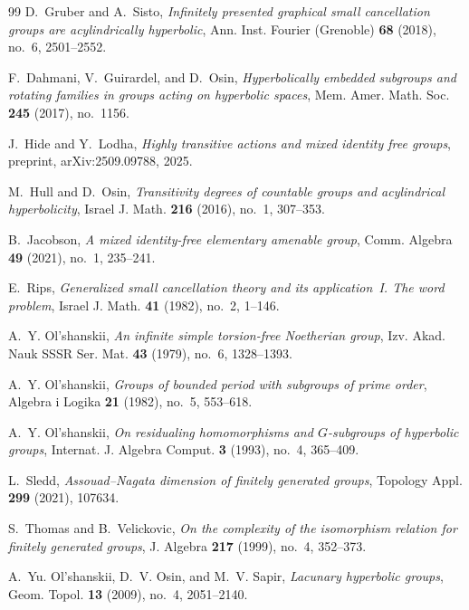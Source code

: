 \documentclass[12pt]{amsart}
\theoremstyle{plain}
\theoremstyle{definition}
\begin{document}
\begin{thebibliography}{99}
D.~Gruber and A.~Sisto,
\textit{Infinitely presented graphical small cancellation groups are acylindrically hyperbolic},
Ann. Inst. Fourier (Grenoble) \textbf{68} (2018), no.~6, 2501--2552.

F.~Dahmani, V.~Guirardel, and D.~Osin,
\textit{Hyperbolically embedded subgroups and rotating families in groups acting
on hyperbolic spaces},
Mem. Amer. Math. Soc. \textbf{245} (2017), no.~1156.

J.~Hide and Y.~Lodha,
\textit{Highly transitive actions and mixed identity free groups},
preprint, arXiv:2509.09788, 2025.

M.~Hull and D.~Osin,
\textit{Transitivity degrees of countable groups and acylindrical hyperbolicity},
Israel J. Math. \textbf{216} (2016), no.~1, 307--353.


B.~Jacobson,
\textit{A mixed identity-free elementary amenable group},
Comm. Algebra \textbf{49} (2021), no.~1, 235--241.


E.~Rips,
\textit{Generalized small cancellation theory and its application~I\@. The word problem},
Israel J. Math. \textbf{41} (1982), no.~2, 1--146.

A.~Y. Ol'shanskii, \textit{An infinite simple torsion-free Noetherian group}, Izv. Akad. Nauk SSSR Ser. Mat. \textbf{43} (1979), no.~6, 1328--1393.


A.~Y. Ol'shanskii, \textit{Groups of bounded period with subgroups of prime order}, Algebra i Logika {\bf 21} (1982), no.~5, 553--618.


 A.~Y. Ol'shanskii, \textit{On residualing homomorphisms and $G$-subgroups of hyperbolic groups}, Internat. J. Algebra Comput. \textbf{3} (1993), no.~4, 365--409. 


L.~Sledd,
\textit{Assouad--Nagata dimension of finitely generated groups},
Topology Appl. \textbf{299} (2021), 107634.

S.~Thomas and B.~Velickovic,
\textit{On the complexity of the isomorphism relation for finitely generated groups},
J. Algebra \textbf{217} (1999), no.~4, 352--373.

A.~Yu. Ol'shanskii, D.~V. Osin, and M.~V. Sapir,
\textit{Lacunary hyperbolic groups},
Geom. Topol. \textbf{13} (2009), no.~4, 2051--2140.

\end{thebibliography}
\end{document}

